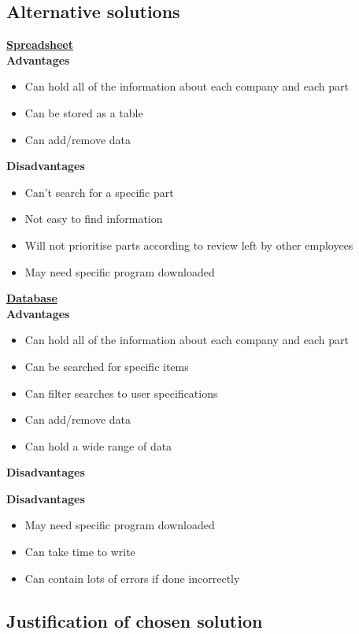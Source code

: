 \subsection{Alternative solutions}
\bf \underline{Spreadsheet}
\\
\bf {Advantages}
\begin{itemize}
	\item Can hold all of the information about each company and each part
	\item Can be stored as a table
	\item Can add/remove data
\end{itemize}
\bf {Disadvantages}
\begin{itemize}
	\item Can't search for a specific part
	\item Not easy to find information
	\item Will not prioritise parts according to review left by other employees
	\item May need specific program downloaded
\end{itemize}
\bf \underline{Database}
\\
\bf {Advantages}
\begin{itemize}
	\item Can hold all of the information about each company and each part
	\item Can be searched for specific items
	\item Can filter searches to user specifications 
	\item Can add/remove data
	\item Can hold a wide range of data
\end{itemize}
\bf {Disadvantages}
\bf {Disadvantages}
\begin{itemize}
	\item May need specific program downloaded
	\item Can take time to write
	\item Can contain lots of errors if done incorrectly
\end{itemize}
\subsection{Justification of chosen solution}